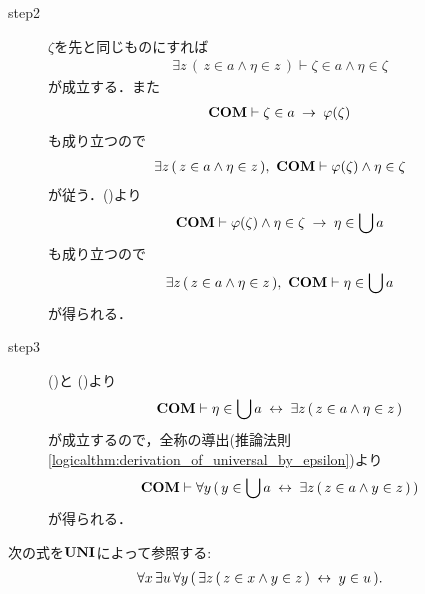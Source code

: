 \begin{sketch}
\begin{description}
			\item[step2]
				$\zeta$を先と同じものにすれば
				\begin{align}
					\exists z\, (\, z \in a \wedge \eta \in z\, )
					\vdash \zeta \in a \wedge \eta \in \zeta
				\end{align}
				が成立する．また
				\begin{align}
					\mbox{\bf COM} \vdash \zeta \in a \hspace{0.25em}\rightarrow\hspace{0.25em} \varphi(\zeta)
				\end{align}
				も成り立つので
				\begin{align}
					\exists z\, (\, z \in a \wedge \eta \in z\, ),\ \COMAX
					\vdash \varphi(\zeta) \wedge \eta \in \zeta
				\end{align}
				が従う．()より
				\begin{align}
					\mbox{\bf COM} \vdash \varphi(\zeta) \wedge \eta \in \zeta
					\hspace{0.25em}\rightarrow\hspace{0.25em} \eta \in \bigcup a
				\end{align}
				も成り立つので
				\begin{align}
					\exists z\, (\, z \in a \wedge \eta \in z\, ),\ \COMAX \vdash 
					\eta \in \bigcup a
					\label{fom:comprehension_of_unions_3}
				\end{align}
				が得られる．
			
			\item[step3]
				()と
				()より
				\begin{align}
					\mbox{\bf COM} \vdash \eta \in \bigcup a 
					\hspace{0.25em}\leftrightarrow\hspace{0.25em} \exists z\, (\, z \in a \wedge \eta \in z\, )
				\end{align}
				が成立するので，全称の導出(推論法則\ref{logicalthm:derivation_of_universal_by_epsilon})より
				\begin{align}
					\mbox{\bf COM} \vdash \forall y\, (\, y \in \bigcup a 
					\hspace{0.25em}\leftrightarrow\hspace{0.25em} \exists z\, (\, z \in a \wedge y \in z\, )\, )
				\end{align}
				が得られる．
				\QED
		\end{description}
	\end{sketch}
	
	\begin{screen}
		\begin{axm}[合併の公理]
			次の式を$\mbox{{\bf UNI}}$によって参照する:
			\begin{align}
				\forall x\, \exists u\, \forall y\, (\, \exists z\, (\, z \in x \wedge y \in z\, ) \hspace{0.25em}\leftrightarrow\hspace{0.25em} y \in u\, ).
			\end{align}
		\end{axm}
	\end{screen}
	
